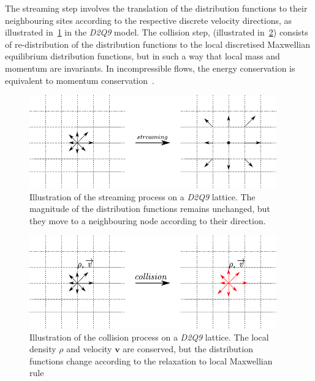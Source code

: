 The streaming step involves the translation of the distribution functions to 
their neighbouring sites according to the respective discrete velocity 
directions, as illustrated in~\cref{fig:stream} in the \textit{D2Q9} model. 
The collision step, (illustrated in~\cref{fig:collision}) consists of 
re-distribution of the distribution functions to the local discretised 
Maxwellian equilibrium distribution functions, but in such a way that local 
mass and momentum are invariants. In incompressible flows, the energy 
conservation is equivalent to momentum conservation~\citep{He1997}.

\begin{figure}[htpb]
	\centering
	\includegraphics[width=0.95\textwidth]{stream}
	\caption[Illustration of the streaming process on a \textit{D2Q9} 
	lattice]{Illustration of the streaming process on a \textit{D2Q9} lattice. 
	The magnitude of the distribution functions remains unchanged, but they 
	move to a neighbouring node according to their direction.}
	\label{fig:stream}
\end{figure}

\begin{figure}[htbp]
	\centering
	\includegraphics[width=0.95\textwidth]{collision}
	\caption[Illustration of the collision process on a \textit{D2Q9} 
	lattice]{Illustration of the collision process on a \textit{D2Q9} lattice. 
	The local density $\rho$ and velocity $\mathbf{v}$ are conserved, but the 
	distribution functions change according to the relaxation to local 
	Maxwellian rule}
	\label{fig:collision}
\end{figure} 

